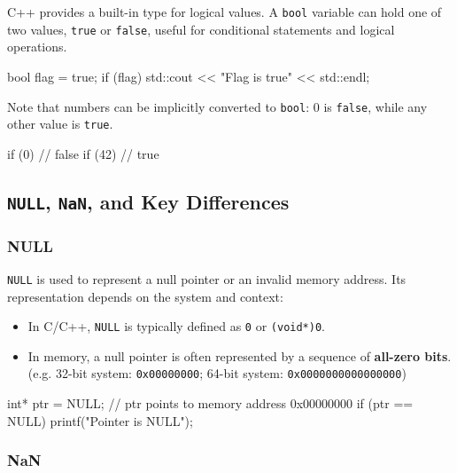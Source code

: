 C++ provides a built-in  type for logical values. A \texttt{bool} variable can hold one of two values, \texttt{true} or \texttt{false}, useful for conditional statements and logical operations. 

\begin{codeblock}[language=C++, numbers=none]
bool flag = true;
if (flag) {
    std::cout << "Flag is true" << std::endl;
}
\end{codeblock}

Note that numbers can be implicitly converted to \texttt{bool}: 0 is \texttt{false}, while any other value is \texttt{true}.

\begin{codeblock}[language=C++, numbers=none]
if (0)    // false
if (42)   // true
\end{codeblock}

\subsection{\texttt{NULL}, \texttt{NaN}, and Key Differences}

\subsubsection{NULL}

\texttt{NULL} is used to represent a null pointer or an invalid memory address. Its representation depends on the system and context:

\begin{itemize}
    \item In C/C++, \texttt{NULL} is typically defined as \texttt{0} or \texttt{(void*)0}.
    \item In memory, a null pointer is often represented by a sequence of \textbf{all-zero bits}. (e.g. 32-bit system: \texttt{0x00000000}; 64-bit system: \texttt{0x0000000000000000})
\end{itemize}

\begin{exampleblock}
    \begin{codeblock}[language=C++]
int* ptr = NULL; // ptr points to memory address 0x00000000
if (ptr == NULL) {
    printf("Pointer is NULL\n");
}
    \end{codeblock}
\end{exampleblock}

\subsubsection{NaN}

